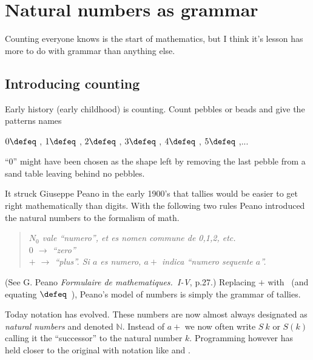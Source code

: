 \section{Natural numbers as grammar}
Counting everyone knows is the start of mathematics, but I think it's lesson 
has more to do with grammar than anything else. 

\subsection{Introducing counting}
Early history (early childhood) is counting.  Count 
pebbles or beads and give the patterns names
\begin{center}
    $0\defeq$ \underline{\hspace{5mm}}, 
    $1\defeq$ \StrokeOne,
    $2\defeq$ \StrokeTwo,
    $3\defeq$ \StrokeThree,
    $4\defeq$ \StrokeFour,
    $5\defeq$ \StrokeFive,...
\end{center}
``0'' might have been chosen as the shape left by removing the last pebble from
a sand table leaving behind no pebbles.

It struck Giuseppe Peano in the early 1900's that tallies 
would be easier to get right mathematically than digits. With the following two rules
Peano introduced the natural numbers to the formalism of math.
\begin{quote}
    \textit{
    $N_0$ vale ``numero'', et es nomen commune de 0,1,2, etc.\\
    $0$ $\to$  ``zero''\\
    $+$ $\to$ ``plus''.  Si $a$ es numero, $a+$ indica ``numero sequente $a$''.
    }
\end{quote}
(See G. Peano \emph{Formulaire de mathematiques.~I-V}, p.27.)
Replacing $+$ with \StrokeOne ~(and equating \StrokeFive$\defeq$\StrokeFour~\StrokeOne),
Peano's model of numbers is simply the grammar of tallies.

Today notation has evolved.  These numbers are now almost always designated as
\emph{natural numbers} and denoted $\mathbb{N}$.  Instead of $a+$ we now 
often write $S~k$  or $S(k)$ calling it the ``successor'' to the natural number $k$.  
Programming however has held closer to the original with notation like 
 and .

